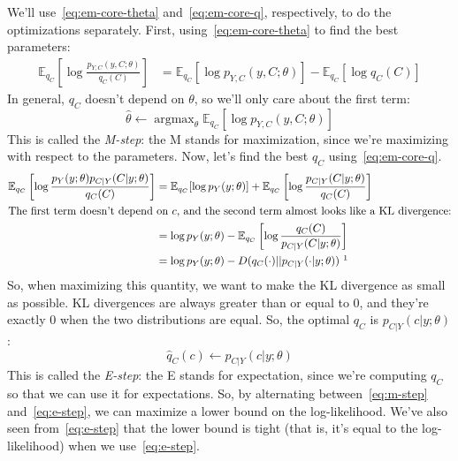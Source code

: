\documentclass[12pt]{article}
\DeclareMathOperator*{\argmax}{\mathrm{argmax}}
\begin{document}
    We'll use~\eqref{eq:em-core-theta} and~\eqref{eq:em-core-q}, respectively, to
    do the optimizations separately. First, using~\eqref{eq:em-core-theta} to find the
    best parameters:
    \begin{align*}
        \mathbb{E}_{q_C}\left[\log \frac{p_{Y,C}(y,C; \theta)}{q_C(C)} \right]
        &= \mathbb{E}_{q_C}\left[\log p_{Y,C}(y,C; \theta)\right] - \mathbb{E}_{q_C} [\log q_C(C)]
    \end{align*}
    In general, $q_C$ doesn't depend on $\theta$, so we'll only care about the first term:
    \begin{equation}
        \label{eq:m-step} \boxed{\widehat{\theta} \gets \argmax_\theta \mathbb{E}_{q_C}\left[\log p_{Y,C}(y,C; \theta)\right]}
    \end{equation}
    This is called the \emph{M-step}: the M stands for maximization, since we're
    maximizing with respect to the parameters.
    Now, let's find the best $q_C$ using~\eqref{eq:em-core-q}.
    \begin{align}
        \notag \mathbb{E}_{q_C}\left[\log \frac{p_{Y}(y; \theta)p_{C|Y}(C|y; \theta)}{q_C(C)} \right]
        &= \mathbb{E}_{q_C}[\log p_{Y}(y; \theta)] + \mathbb{E}_{q_C}\left[\log \frac{p_{C|Y}(C|y; \theta)}{q_C(C)}\right] \\
        \intertext{The first term doesn't depend on $c$, and the second term almost looks like a KL divergence:}
        \notag &= \log p_{Y}(y; \theta) - \mathbb{E}_{q_C}\left[\log \frac{q_C(C)}{p_{C|Y}(C|y; \theta)}\right] \\
        \label{eq:e-step-divergence} &= \log p_{Y}(y; \theta) - D(q_C(\cdot)||p_{C|Y}(\cdot|y; \theta))~\footnotemark
    \end{align}
    So, when maximizing this quantity, we want to make the KL divergence as
    small as possible. KL divergences are always greater than or equal to 0,
    and they're exactly 0 when the two distributions are equal. So, the optimal
    $q_C$ is $p_{C|Y}(c|y; \theta)$:
    \begin{equation}
        \label{eq:e-step} \boxed{\widehat{q}_C(c) \gets p_{C|Y}(c|y; \theta)}
    \end{equation}
    This is called the \emph{E-step}: the E stands for expectation, since we're
    computing $q_C$ so that we can use it for expectations.
    So, by alternating between~\eqref{eq:m-step} and~\eqref{eq:e-step}, we can
    maximize a lower bound on the log-likelihood. We've also seen from~\eqref{eq:e-step}
    that the lower bound is tight (that is, it's equal to the log-likelihood)
    when we use~\eqref{eq:e-step}.
\end{document}
